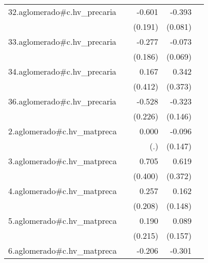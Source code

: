 {\begin{longtable}{l*{4}{D{.}{.}{-1}}}
\addlinespace
32.aglomerado#c.hv\_precaria&                     &      -0.601\sym{**} &      -0.393\sym{***}&                     \\
            &                     &     (0.191)         &     (0.081)         &                     \\
\addlinespace
33.aglomerado#c.hv\_precaria&                     &      -0.277         &      -0.073         &                     \\
            &                     &     (0.186)         &     (0.069)         &                     \\
\addlinespace
34.aglomerado#c.hv\_precaria&                     &       0.167         &       0.342         &                     \\
            &                     &     (0.412)         &     (0.373)         &                     \\
\addlinespace
36.aglomerado#c.hv\_precaria&                     &      -0.528\sym{*}  &      -0.323\sym{*}  &                     \\
            &                     &     (0.226)         &     (0.146)         &                     \\
\addlinespace
2.aglomerado#c.hv\_matpreca&                     &       0.000         &      -0.096         &                     \\
            &                     &         (.)         &     (0.147)         &                     \\
\addlinespace
3.aglomerado#c.hv\_matpreca&                     &       0.705         &       0.619         &                     \\
            &                     &     (0.400)         &     (0.372)         &                     \\
\addlinespace
4.aglomerado#c.hv\_matpreca&                     &       0.257         &       0.162         &                     \\
            &                     &     (0.208)         &     (0.148)         &                     \\
\addlinespace
5.aglomerado#c.hv\_matpreca&                     &       0.190         &       0.089         &                     \\
            &                     &     (0.215)         &     (0.157)         &                     \\
\addlinespace
6.aglomerado#c.hv\_matpreca&                     &      -0.206         &      -0.301         &                     \\

\end{longtable}}
